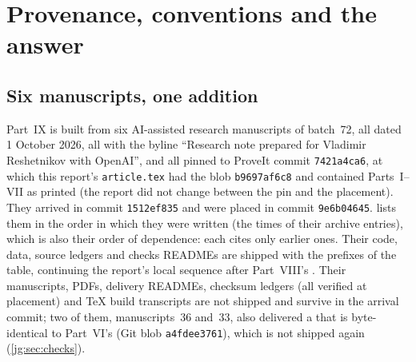 \documentclass[11pt,a4paper]{article}
\theoremstyle{definition}\newaliascnt{definition}{theorem}
\theoremstyle{remark}\newaliascnt{remark}{theorem}
\begin{document}
\section{Provenance, conventions and the answer}
\label{jg:sec:intro}

\subsection{Six manuscripts, one addition}
\label{jg:sec:source}
Part~IX is built from six AI-assisted research manuscripts of batch~72, all
dated 1 October 2026, all with the byline ``Research note prepared for
Vladimir Reshetnikov with OpenAI'', and all pinned to ProveIt commit
\texttt{7421a4ca6}, at which this report's \texttt{article.tex} had the blob
\texttt{b9697af6c8} and contained Parts~I--VII as printed (the report did not
change between the pin and the placement). They arrived in commit
\texttt{1512ef835} and were placed in commit \texttt{9e6b04645}.
 lists them in the order in which they were written (the
times of their archive entries), which is also their order of dependence: each
cites only earlier ones. Their code, data, source ledgers and checks READMEs
are shipped with the prefixes of the table, continuing the report's local
sequence after Part~VIII's . Their manuscripts,
PDFs, delivery READMEs, checksum ledgers (all verified at placement) and
\TeX{} build transcripts are not shipped and survive in the arrival commit;
two of them, manuscripts~36 and~33, also delivered a  that is
byte-identical to Part~VI's  (Git blob
\texttt{a4fdee3761}), which is not shipped again (\cref{jg:sec:checks}).
\end{document}
